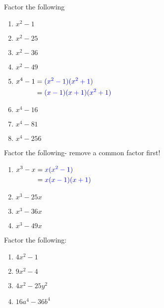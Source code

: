 \begin{myexample}
\drillandskill
Factor the following 
\end{myexample}
\begin{multicols}{2}
	\begin{enumerate}
		\item $x^2-1$  
		\item $x^2-25$ 
		\item $x^2-36$ 
		\item $x^2-49$ 
		\item $
		\begin{aligned}[t]
			x^4-1 & =  {\color{blue}{(x^2-1)(x^2+1)}}    \\
			      & =  {\color{blue}{(x-1)(x+1)(x^2+1)}} 
		\end{aligned}
		$
		\item $x^4-16$ 
		\item $x^4-81$ 
		\item $x^4-256$
	\end{enumerate}
\end{multicols}

Factor the following- remove a common factor first!
\begin{multicols}{2}
	\begin{enumerate}
		\item $
		\begin{aligned}[t]
			x^3-x & =  {\color{blue}{x (x^2-1)}}   \\
			      & =  {\color{blue}{x(x-1)(x+1)}} 
		\end{aligned}$
		\item $x^3-25x$ 
		\item $x^3-36x$ 
		\item $x^3-49x$ 
	\end{enumerate}
\end{multicols}

Factor the following:
\begin{enumerate}
	\item $4x^2-1$        
	\item $9x^2-4$        
	\item $4x^2-25y^2$    
	\item $16a^4 - 36b^4$ 
\end{enumerate}

